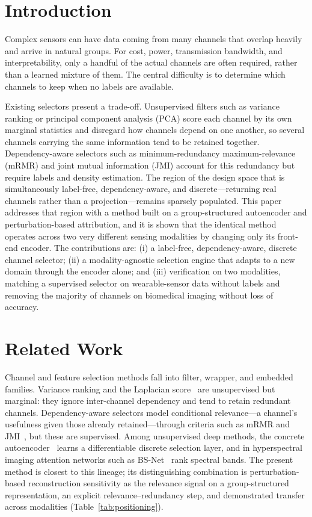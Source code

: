 \documentclass[conference]{IEEEtran}
\begin{document}
\section{Introduction}
Complex sensors can have data coming from many channels that overlap heavily and
arrive in natural groups. For cost, power, transmission bandwidth, and
interpretability, only a handful of the actual channels are often required,
rather than a learned mixture of them. The central difficulty is to determine
which channels to keep when no labels are available.

Existing selectors present a trade-off. Unsupervised filters such as variance
ranking or principal component analysis (PCA) score each channel by its own
marginal statistics and disregard how channels depend on one another, so several
channels carrying the same information tend to be retained together.
Dependency-aware selectors such as minimum-redundancy maximum-relevance (mRMR)
and joint mutual information (JMI) account for this redundancy but require labels
and density estimation. The region of the design space that is simultaneously
label-free, dependency-aware, and discrete---returning real channels rather than
a projection---remains sparsely populated. This paper addresses that region with
a method built on a group-structured autoencoder and perturbation-based
attribution, and it is shown that the identical method operates across two very
different sensing modalities by changing only its front-end encoder. The
contributions are: (i) a label-free, dependency-aware, discrete channel selector;
(ii) a modality-agnostic selection engine that adapts to a new domain through the
encoder alone; and (iii) verification on two modalities, matching a supervised
selector on wearable-sensor data without labels and removing the majority of
channels on biomedical imaging without loss of accuracy.

\section{Related Work}
Channel and feature selection methods fall into filter, wrapper, and embedded
families. Variance ranking and the Laplacian score~\cite{ref_lapscore} are
unsupervised but marginal: they ignore inter-channel dependency and tend to retain
redundant channels. Dependency-aware selectors model conditional relevance---a
channel's usefulness given those already retained---through criteria such as mRMR
and JMI~\cite{ref_mrmr,ref_jmi}, but these are supervised. Among unsupervised deep
methods, the concrete autoencoder~\cite{ref_concrete} learns a differentiable
discrete selection layer, and in hyperspectral imaging attention networks such as
BS-Net~\cite{ref_bsnet} rank spectral bands. The present method is closest to this
lineage; its distinguishing combination is perturbation-based reconstruction
sensitivity as the relevance signal on a group-structured representation, an
explicit relevance--redundancy step, and demonstrated transfer across modalities
(Table~\ref{tab:positioning}).
\end{document}
